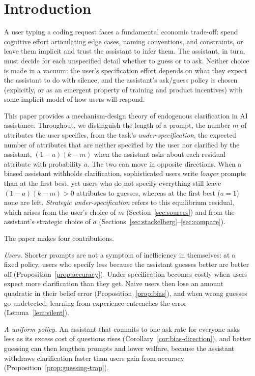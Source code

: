 \documentclass[11pt]{article}
\begin{document}
\section{Introduction}

A user typing a coding request faces a fundamental economic trade-off: spend cognitive effort articulating edge cases, naming conventions, and constraints, or leave them implicit and trust the assistant to infer them. The assistant, in turn, must decide for each unspecified detail whether to guess or to ask. Neither choice is made in a vacuum: the user's specification effort depends on what they expect the assistant to do with silence, and the assistant's ask/guess policy is chosen (explicitly, or as an emergent property of training and product incentives) with some implicit model of how users will respond.

This paper provides a mechanism-design theory of endogenous clarification in AI assistance. Throughout, we distinguish the length of a prompt, the number $m$ of attributes the user specifies, from the task's \emph{under-specification}, the expected number of attributes that are neither specified by the user nor clarified by the assistant, $(1-a)(k-m)$ when the assistant asks about each residual attribute with probability $a$. The two can move in opposite directions. When a biased assistant withholds clarification, sophisticated users write \emph{longer} prompts than at the first best, yet users who do not specify everything still leave $(1-a)(k-m) > 0$ attributes to guesses, whereas at the first best ($a = 1$) none are left. \emph{Strategic under-specification} refers to this equilibrium residual, which arises from the user's choice of $m$ (Section~\ref{sec:sources}) and from the assistant's strategic choice of $a$ (Sections~\ref{sec:stackelberg}--\ref{sec:compare}). 

The paper makes four contributions.

\emph{Users.} Shorter prompts are not a symptom of inefficiency in themselves: at a fixed policy, users who specify less because the assistant guesses better are better off (Proposition~\ref{prop:accuracy}). Under-specification becomes costly when users expect more clarification than they get. Naive users then lose an amount quadratic in their belief error (Proposition~\ref{prop:bias}), and when wrong guesses go undetected, learning from experience entrenches the error (Lemma~\ref{lem:silent}).

\emph{A uniform policy.} An assistant that commits to one ask rate for everyone asks less as its excess cost of questions rises (Corollary~\ref{cor:bias-direction}), and better guessing can then lengthen prompts and lower welfare, because the assistant withdraws clarification faster than users gain from accuracy (Proposition~\ref{prop:guessing-trap}).
\end{document}
